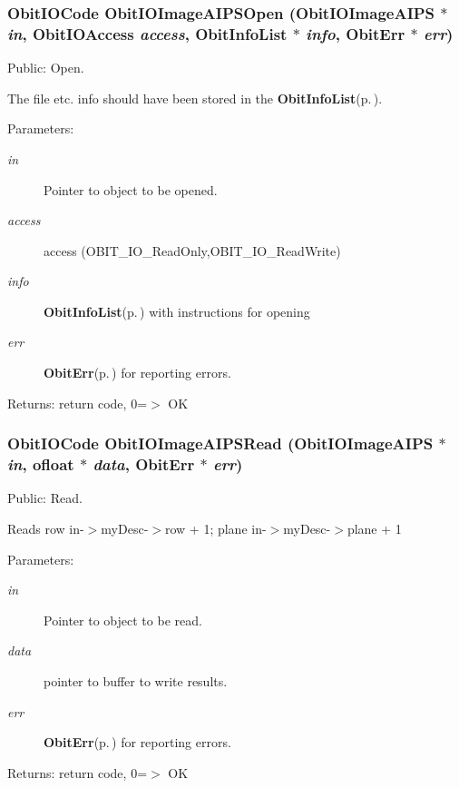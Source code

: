 \subsubsection{\setlength{\rightskip}{0pt plus 5cm}Obit\-IOCode Obit\-IOImage\-AIPSOpen ({\bf Obit\-IOImage\-AIPS} $\ast$ {\em in}, Obit\-IOAccess {\em access}, {\bf Obit\-Info\-List} $\ast$ {\em info}, {\bf Obit\-Err} $\ast$ {\em err})}\label{ObitIOImageAIPS_8h_a10}


Public: Open. 

The file etc. info should have been stored in the {\bf Obit\-Info\-List}{\rm (p.\,\pageref{structObitInfoList})}. \begin{Desc}
\item[Parameters:]
\begin{description}
\item[{\em in}]Pointer to object to be opened. \item[{\em access}]access (OBIT\_\-IO\_\-Read\-Only,OBIT\_\-IO\_\-Read\-Write) \item[{\em info}]{\bf Obit\-Info\-List}{\rm (p.\,\pageref{structObitInfoList})} with instructions for opening \item[{\em err}]{\bf Obit\-Err}{\rm (p.\,\pageref{structObitErr})} for reporting errors. \end{description}
\end{Desc}
\begin{Desc}
\item[Returns:]return code, 0=$>$ OK \end{Desc}
\subsubsection{\setlength{\rightskip}{0pt plus 5cm}Obit\-IOCode Obit\-IOImage\-AIPSRead ({\bf Obit\-IOImage\-AIPS} $\ast$ {\em in}, {\bf ofloat} $\ast$ {\em data}, {\bf Obit\-Err} $\ast$ {\em err})}\label{ObitIOImageAIPS_8h_a13}


Public: Read. 

Reads row in-$>$my\-Desc-$>$row + 1; plane in-$>$my\-Desc-$>$plane + 1 \begin{Desc}
\item[Parameters:]
\begin{description}
\item[{\em in}]Pointer to object to be read. \item[{\em data}]pointer to buffer to write results. \item[{\em err}]{\bf Obit\-Err}{\rm (p.\,\pageref{structObitErr})} for reporting errors. \end{description}
\end{Desc}
\begin{Desc}
\item[Returns:]return code, 0=$>$ OK \end{Desc}

